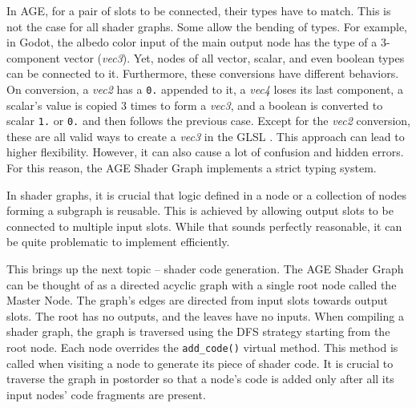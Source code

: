 \documentclass[
  digital,     %
  oneside,     %
  nosansbold,  %
  nocolorbold, %
  lof,         %
  lot,         %
]{fithesis4}
\begin{document}
In AGE, for a pair of slots to be connected, their types have to match.
This is not the case for all shader graphs. Some allow the bending of types.
For example, in Godot, the albedo color input of the main output node has the type of a 3-component vector (\textit{vec3}).
Yet, nodes of all vector, scalar, and even boolean types can be connected to it. Furthermore, these conversions
have different behaviors. On conversion, a \textit{vec2} has a \verb|0.| appended to it, a \textit{vec4} loses
its last component, a scalar's value is copied 3 times to form a \textit{vec3}, and a boolean is converted
to scalar \verb|1.| or \verb|0.| and then follows the previous case. Except for the \textit{vec2} conversion,
these are all valid ways to create a \textit{vec3} in the GLSL \cite{openglwiki-datatype}.
This approach can lead to higher flexibility. However, it can also cause a lot of confusion and hidden errors.
For this reason, the AGE Shader Graph implements a strict typing system.

In shader graphs, it is crucial that logic defined in a node or a collection of nodes forming a subgraph
is reusable. This is achieved by allowing output slots to be connected to multiple input slots.
While that sounds perfectly reasonable, it can be quite problematic to implement efficiently.

This brings up the next topic -- shader code generation. The AGE Shader Graph can be thought of as
a directed acyclic graph with a single root node called the Master Node. The graph's edges are
directed from input slots towards output slots. The root has no outputs, and the leaves have no inputs.
When compiling a shader graph, the graph is traversed using the DFS 
strategy starting from the root node. Each node overrides the \verb|add_code()| virtual method.
This method is called when visiting a node to generate its piece of shader code.
It is crucial to traverse the graph in postorder so that a node's code is added only after all its input nodes'
code fragments are present.
\end{document}
